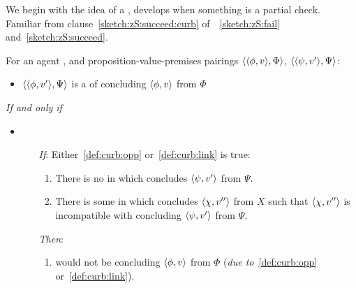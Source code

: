 \begin{note}[\curb{3}]
  We begin with the idea of a \curb{}, develops when something is a partial check.
  Familiar from clause~\autoref{sketch:zS:succeed:curb} of~~\ref{sketch:zS:fail} and~\ref{sketch:zS:succeed}.

  \begin{definition}[A \curb{0}]
    \label{def:curb}
    For an agent \vAgent{}, and proposition-value-premises pairings \(\langle \langle \phi, v \rangle, \Phi \rangle\), \(\langle \langle \psi, v' \rangle, \Psi \rangle\):

    \begin{itemize}
    \item
      \(\langle \langle \phi, v' \rangle, \Psi \rangle\) is a \emph{\curb{}} of concluding \(\langle \phi, v \rangle\) from \(\Phi\)
    \end{itemize}

    \emph{If and only if}

    \begin{itemize}
    \item
        \begin{enumerate}
        \item[\emph{If}:]
          Either~\ref{def:curb:opp} or~\ref{def:curb:link} is true:

          \begin{enumerate}[label=\alph*., ref=(\alph*)]
          \item
            \label{def:curb:opp}
            There is no \pevent{} in which \vAgent{} concludes \(\langle \psi, v' \rangle\) from \(\Psi\).
          \item
            \label{def:curb:link}
            There is some \pevent{} in which \vAgent{} concludes \(\langle \chi, v'' \rangle\) from \(X\) such that \(\langle \chi, v'' \rangle\) is incompatible with concluding \(\langle \psi, v' \rangle\) from \(\Psi\).
          \end{enumerate}
        \item[\emph{Then}:]
          \begin{enumerate}[label=\alph*., ref=(\alph*), resume]
          \item
            \label{def:curb:fail}
            \vAgent{} would not be concluding \(\langle \phi, v \rangle\) from \(\Phi\) (\emph{due to}~\ref{def:curb:opp} or~\ref{def:curb:link}).
          \end{enumerate}
      \end{enumerate}
    \end{itemize}
    \vspace{-\baselineskip}
  \end{definition}


\end{note}

